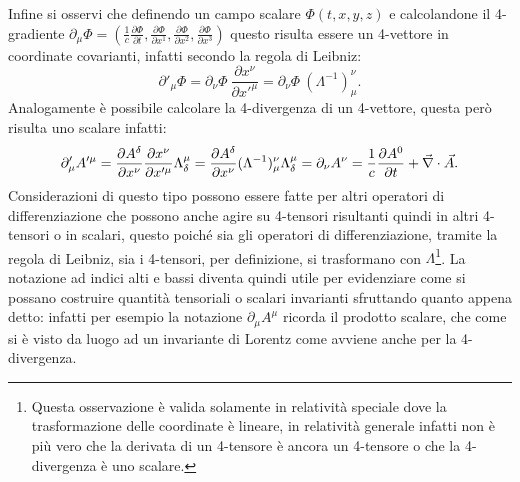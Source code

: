 Infine si osservi che definendo un campo scalare $\Phi(t,x,y,z)$ e calcolandone il 4-gradiente $\partial_\mu\Phi=(\frac{1}{c}\frac{\partial\Phi}{\partial t},\frac{\partial\Phi}{\partial x^1},\frac{\partial\Phi}{\partial x^2},\frac{\partial\Phi}{\partial x^3})$ questo risulta essere un 4-vettore in coordinate covarianti, infatti secondo la regola di Leibniz:
\begin{equation*}
    \partial'_\mu\Phi=\partial_\nu\Phi\ \frac{\partial x^\nu}{\partial x'^\mu}=\partial_\nu\Phi\ (\Lambda^{-1})_\mu^\nu.
\end{equation*}
Analogamente è possibile calcolare la 4-divergenza di un 4-vettore, questa però risulta uno scalare infatti:
\begin{equation*}
    \partial'_\mu A'^\mu=\frac{\partial A^\delta}{\partial x^\nu} \frac{\partial x^\nu}{\partial x'^\mu}\Lambda^\mu_\delta=\frac{\partial A^\delta}{\partial x^\nu}(\Lambda^{-1})_\mu^\nu \Lambda^\mu_\delta=\partial_\nu A^\nu=\frac{1}{c}\frac{\partial A^0}{\partial t}+\vec{\nabla}\cdot \vec{A}.
\end{equation*} 
Considerazioni di questo tipo possono essere fatte per altri operatori di differenziazione che possono anche agire su 4-tensori risultanti quindi in altri 4-tensori o in scalari, questo poiché sia gli operatori di differenziazione, tramite la regola di Leibniz, sia i 4-tensori, per definizione, si trasformano con $\Lambda$\footnote{Questa osservazione è valida solamente in relatività speciale dove la trasformazione delle coordinate è lineare, in relatività generale infatti non è più vero che la derivata di un 4-tensore è ancora un 4-tensore o che la 4-divergenza è uno scalare.}. La notazione ad indici alti e bassi diventa quindi utile per evidenziare come si possano costruire quantità tensoriali o scalari invarianti sfruttando quanto appena detto: infatti per esempio la notazione $\partial_\mu A^\mu$ ricorda il prodotto scalare, che come si è visto da luogo ad un invariante di Lorentz come avviene anche per la 4-divergenza.
